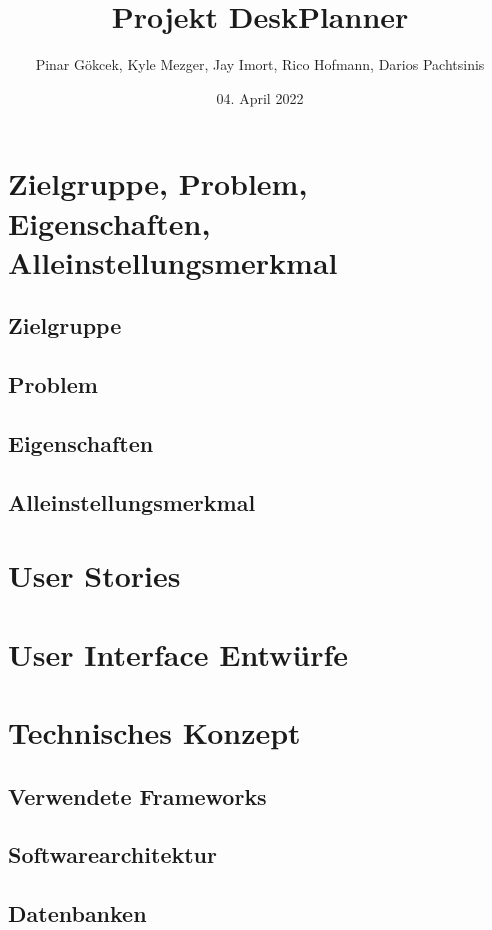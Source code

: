 \documentclass{article}
\title{Projekt DeskPlanner}
\author{Pinar Gökcek, Kyle Mezger, Jay Imort, Rico Hofmann, Darios Pachtsinis}
\date{04. April 2022}
\begin{document}
\begin{titlepage}
    \centering
    \maketitle

    \vfill

\end{titlepage}

\tableofcontents

\pagebreak

\section{Zielgruppe, Problem, Eigenschaften, Alleinstellungsmerkmal}

\subsection{Zielgruppe}

\subsection{Problem}

\subsection{Eigenschaften}

\subsection{Alleinstellungsmerkmal}

\section{User Stories}

\section{User Interface Entwürfe}

\section{Technisches Konzept}

\subsection{Verwendete Frameworks}

\subsection{Softwarearchitektur}

\subsection{Datenbanken}

% 


\end{document}
